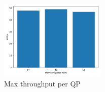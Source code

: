 \begin{figure}[t]
    \includegraphics[width=0.45\textwidth]{fig/qp_bottleneck.pdf}
    \caption{Max throughput per QP }
    \label{fig:qp_bottleneck}
\end{figure}

 





